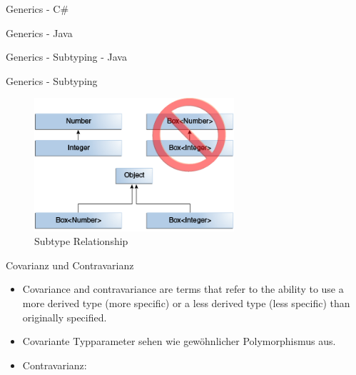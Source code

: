\documentclass[11pt]{beamer}
\begin{document}

\begin{frame}{Generics - C\#}
\end{frame}

\begin{frame}{Generics - Java}
\end{frame}

\begin{frame}{Generics - Subtyping - Java}
\end{frame}

\begin{frame}{Generics - Subtyping}
	\begin{figure}
			\includegraphics[width=0.66\textwidth]{bilder/generics-subtypeRelationship.png}
			\caption{Subtype Relationship \cite{java_generics_inheritance}}
	\end{figure}
\end{frame}

\begin{frame}{Covarianz und Contravarianz}
	\begin{itemize}
		\item \glqq Covariance and contravariance are terms that refer to the ability to use a more derived type (more specific) or a less derived type (less specific) than originally specified.\grqq{} \cite{csharp_docs_variance}
		\item Covariante Typparameter  sehen wie \glqq gewöhnlicher\grqq{} Polymorphismus aus.
		\item Contravarianz:
	\end{itemize}

\end{frame}
\end{document}
